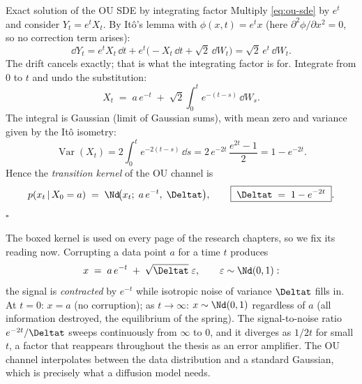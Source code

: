 \begin{toolbox}{Exact solution of the OU SDE by integrating factor}
Multiply \eqref{eq:ou-sde} by $e^{t}$ and consider $Y_t = e^{t} X_t$. By
It\^o's lemma with $\phi(x,t) = e^{t}x$ (here
$\partial^2 \phi/\partial x^2 = 0$, so no correction term arises):
\begin{equation*}
  \dd Y_t
  = e^{t} X_t\,\dd t + e^{t}\big( -X_t\,\dd t + \sqrt{2}\,\dd W_t \big)
  = \sqrt{2}\, e^{t}\, \dd W_t .
\end{equation*}
The drift cancels exactly; that is what the integrating factor is for.
Integrate from $0$ to $t$ and undo the substitution:
\begin{equation*}
  X_t \;=\; a\, e^{-t} \;+\; \sqrt{2} \int_0^t e^{-(t-s)}\, \dd W_s .
\end{equation*}
The integral is Gaussian (limit of Gaussian sums), with mean zero and
variance given by the It\^o isometry:
\begin{equation*}
  \operatorname{Var}(X_t)
  = 2 \int_0^t e^{-2(t-s)}\, \dd s
  = 2\, e^{-2t}\, \frac{e^{2t} - 1}{2}
  = 1 - e^{-2t} .
\end{equation*}
Hence the \emph{transition kernel} of the OU channel is
\begin{equation*}
  p(x_t \,|\, X_0 = a)
  \;=\; \Nd\!\big( x_t;\; a\,e^{-t},\; \Deltat \big),
  \qquad
  \boxed{\;\Deltat \;=\; 1 - e^{-2t}\;} .
\end{equation*}
\hfill$\square$
\end{toolbox}

The boxed kernel is used on every page of the research chapters, so we
fix its reading now. Corrupting a data point $a$ for a time $t$ produces
\begin{equation}
  x \;=\; a\, e^{-t} \;+\; \sqrt{\Deltat}\;\varepsilon,
  \qquad \varepsilon \sim \Nd(0, 1):
  \label{eq:ou-channel}
\end{equation}
the signal is \emph{contracted} by $e^{-t}$ while isotropic noise of
variance $\Deltat$ fills in. At $t = 0$: $x = a$ (no corruption); as
$t \to \infty$: $x \sim \Nd(0, 1)$ regardless of $a$ (all information
destroyed, the equilibrium of the spring). The signal-to-noise ratio
$e^{-2t}/\Deltat$ sweeps continuously from $\infty$ to $0$, and it
diverges as $1/2t$ for small $t$, a factor that reappears throughout the
thesis as an error amplifier. The OU channel interpolates between the
data distribution and a standard Gaussian, which is precisely what a
diffusion model needs.

